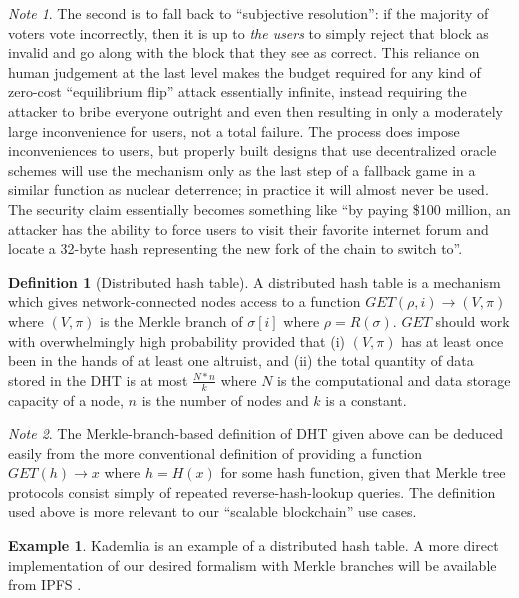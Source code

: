 \documentclass[11pt,a4paper]{report}
\theoremstyle{plain}
\theoremstyle{definition}
\newtheorem{defn}{Definition}[chapter]
\newtheorem{exmp}{Example}[section]
\theoremstyle{remark}
\newtheorem*{note}{Note}
\begin{document}
\begin{note}
The second is to fall back to ``subjective resolution'': if the majority of voters vote incorrectly, then it is up to \emph{the users} to simply reject that block as invalid and go along with the block that they see as correct. This reliance on human judgement at the last level makes the budget required for any kind of zero-cost ``equilibrium flip'' attack essentially infinite, instead requiring the attacker to bribe everyone outright and even then resulting in only a moderately large inconvenience for users, not a total failure. The process does impose inconveniences to users, but properly built designs that use decentralized oracle schemes will use the mechanism only as the last step of a fallback game in a similar function as nuclear deterrence; in practice it will almost never be used. The security claim essentially becomes something like ``by paying \$100 million, an attacker has the ability to force users to visit their favorite internet forum and locate a 32-byte hash representing the new fork of the chain to switch to''.
\end{note}

\begin{defn}[Distributed hash table]
A distributed hash table is a mechanism which gives network-connected nodes access to a function $GET(\rho, i) \rightarrow (V, \pi)$ where $(V, \pi)$ is the Merkle branch of $\sigma[i]$ where $\rho = R(\sigma)$. $GET$ should work with overwhelmingly high probability provided that (i) $(V, \pi)$ has at least once been in the hands of at least one altruist, and (ii) the total quantity of data stored in the DHT is at most $\frac{N * n}{k}$ where $N$ is the computational and data storage capacity of a node, $n$ is the number of nodes and $k$ is a constant.
\end{defn}

\begin{note}
The Merkle-branch-based definition of DHT given above can be deduced easily from the more conventional definition of providing a function $GET(h) \rightarrow x$ where $h = H(x)$ for some hash function, given that Merkle tree protocols consist simply of repeated reverse-hash-lookup queries. The definition used above is more relevant to our ``scalable blockchain'' use cases.
\end{note}

\begin{exmp}
Kademlia \citep{maymounkov_kademlia:_2002} is an example of a distributed hash table. A more direct implementation of our desired formalism with Merkle branches will be available from IPFS \citep{benet_ipfs_2014}.
\end{exmp}
\end{document}
